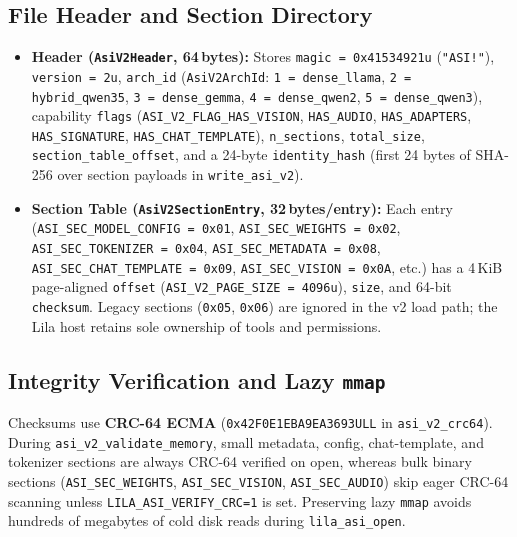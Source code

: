 \documentclass[11pt,a4paper]{article}
\begin{document}
\subsection{File Header and Section Directory}
\begin{itemize}
    \item \textbf{Header (\texttt{AsiV2Header}, 64\,bytes):} Stores \texttt{magic = 0x41534921u} (\texttt{"ASI!"}), \texttt{version = 2u}, \texttt{arch\_id} (\texttt{AsiV2ArchId}: \texttt{1 = dense\_llama}, \texttt{2 = hybrid\_qwen35}, \texttt{3 = dense\_gemma}, \texttt{4 = dense\_qwen2}, \texttt{5 = dense\_qwen3}), capability \texttt{flags} (\texttt{ASI\_V2\_FLAG\_HAS\_VISION}, \texttt{HAS\_AUDIO}, \texttt{HAS\_ADAPTERS}, \texttt{HAS\_SIGNATURE}, \texttt{HAS\_CHAT\_TEMPLATE}), \texttt{n\_sections}, \texttt{total\_size}, \texttt{section\_table\_offset}, and a 24-byte \texttt{identity\_hash} (first 24 bytes of SHA-256 over section payloads in \texttt{write\_asi\_v2}).
    \item \textbf{Section Table (\texttt{AsiV2SectionEntry}, 32\,bytes/entry):} Each entry (\texttt{ASI\_SEC\_MODEL\_CONFIG = 0x01}, \texttt{ASI\_SEC\_WEIGHTS = 0x02}, \texttt{ASI\_SEC\_TOKENIZER = 0x04}, \texttt{ASI\_SEC\_METADATA = 0x08}, \texttt{ASI\_SEC\_CHAT\_TEMPLATE = 0x09}, \texttt{ASI\_SEC\_VISION = 0x0A}, etc.) has a 4\,KiB page-aligned \texttt{offset} (\texttt{ASI\_V2\_PAGE\_SIZE = 4096u}), \texttt{size}, and 64-bit \texttt{checksum}. Legacy sections (\texttt{0x05}, \texttt{0x06}) are ignored in the v2 load path; the Lila host retains sole ownership of tools and permissions.
\end{itemize}

\subsection{Integrity Verification and Lazy \texttt{mmap}}
Checksums use \textbf{CRC-64 ECMA} (\texttt{0x42F0E1EBA9EA3693ULL} in \texttt{asi\_v2\_crc64}). During \texttt{asi\_v2\_validate\_memory}, small metadata, config, chat-template, and tokenizer sections are always CRC-64 verified on open, whereas bulk binary sections (\texttt{ASI\_SEC\_WEIGHTS}, \texttt{ASI\_SEC\_VISION}, \texttt{ASI\_SEC\_AUDIO}) skip eager CRC-64 scanning unless \texttt{LILA\_ASI\_VERIFY\_CRC=1} is set. Preserving lazy \texttt{mmap} avoids hundreds of megabytes of cold disk reads during \texttt{lila\_asi\_open}.
\end{document}

